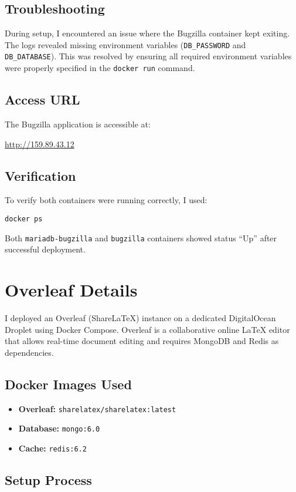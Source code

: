 \subsection{Troubleshooting}
During setup, I encountered an issue where the Bugzilla container kept exiting. The logs revealed missing environment variables (\texttt{DB\_PASSWORD} and \texttt{DB\_DATABASE}). This was resolved by ensuring all required environment variables were properly specified in the \texttt{docker run} command.

\subsection{Access URL}
The Bugzilla application is accessible at:

\url{http://159.89.43.12}

\subsection{Verification}
To verify both containers were running correctly, I used:
\begin{verbatim}
docker ps
\end{verbatim}

Both \texttt{mariadb-bugzilla} and \texttt{bugzilla} containers showed status ``Up'' after successful deployment.

\section{Overleaf Details}

I deployed an Overleaf (ShareLaTeX) instance on a dedicated DigitalOcean Droplet using Docker Compose. Overleaf is a collaborative online LaTeX editor that allows real-time document editing and requires MongoDB and Redis as dependencies.

\subsection{Docker Images Used}
\begin{itemize}
    \item \textbf{Overleaf:} \texttt{sharelatex/sharelatex:latest}
    \item \textbf{Database:} \texttt{mongo:6.0}
    \item \textbf{Cache:} \texttt{redis:6.2}
\end{itemize}

\subsection{Setup Process}

